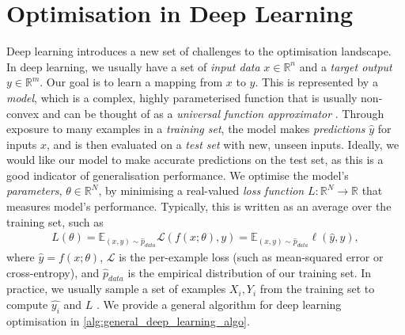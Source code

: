 
\newpage

\section{Optimisation in Deep Learning}
\label{sec:optimisation_in_deep_learning}

Deep learning introduces a new set of challenges to the optimisation landscape. In deep learning, we usually have a set of \textit{input data} $x \in \mathbb{R}^n$ and a \textit{target output} $y \in \mathbb{R}^m$. Our goal is to learn a mapping from $x$ to $y$. This is represented by a \textit{model}, which is a complex, highly parameterised function that is usually non-convex and can be thought of as a \textit{universal function approximator} \citep{universal_func_approx}. Through exposure to many examples in a \textit{training set}, the model makes \textit{predictions} $\hat{y}$ for inputs $x$, and is then evaluated on a \textit{test set} with new, unseen inputs. Ideally, we would like our model to make accurate predictions on the test set, as this is a good indicator of generalisation performance. We optimise the model's \textit{parameters}, $\theta \in \mathbb{R}^N$, by minimising a real-valued \textit{loss function} $L: \mathbb{R}^N \to \mathbb{R}$ that measures model's performance. Typically, this is written as an average over the training set, such as
\begin{align}
    L(\theta) = \mathbb{E}_{(x, y) \sim \hat{p}_{data}} \mathcal{L}(f(x; \theta), y) = \mathbb{E}_{(x, y) \sim \hat{p}_{data}} \ell(\hat{y}, y),
    \label{eq:loss_function}
\end{align}
where $\hat{y} = f(x; \theta)$, $\mathcal{L}$ is the per-example loss (such as mean-squared error or cross-entropy), and $\hat{p}_{data}$ is the empirical distribution of our training set. In practice, we usually sample a set of examples $X_i, Y_i$ from the training set to compute $\hat{y_i}$ and $L$ \citep{deep_learning_book, pytorch}. We provide a general algorithm for deep learning optimisation in \cref{alg:general_deep_learning_algo}.

